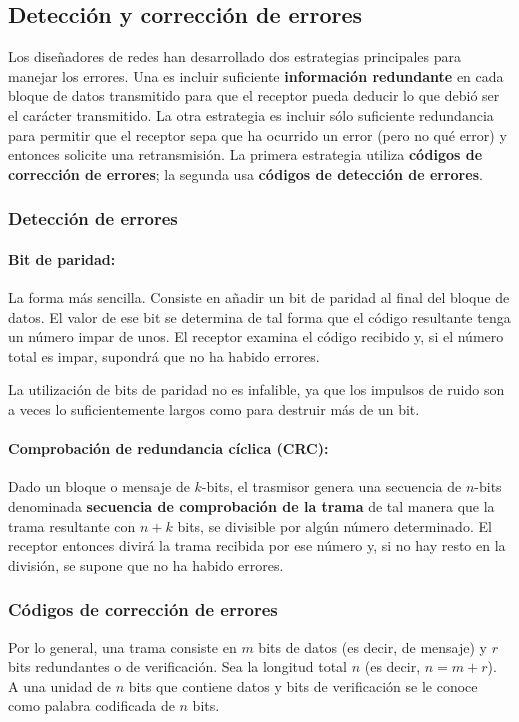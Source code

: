 \subsection{Detección y corrección de errores}

Los diseñadores de redes han desarrollado dos estrategias principales para manejar los errores. Una es incluir suficiente \textbf{información redundante} en cada bloque de datos transmitido para que el receptor pueda deducir lo que debió ser el carácter transmitido. La otra estrategia es incluir sólo suficiente redundancia para permitir que el receptor sepa que ha ocurrido un error (pero no qué error) y entonces solicite una retransmisión. La primera estrategia utiliza \textbf{códigos de corrección de errores}; la segunda usa \textbf{códigos de detección de errores}. 

\subsubsection{Detección de errores}
\paragraph{Bit de paridad:} La forma más sencilla. Consiste en añadir un bit de paridad al final del bloque de datos. El valor de ese bit se determina de tal forma que el código resultante tenga un número impar de unos. El receptor examina el código recibido y, si el número total es impar, supondrá que no ha habido errores. 

La utilización de bits de paridad no es infalible, ya que los impulsos de ruido son a veces lo suficientemente largos como para destruir más de un bit.

\paragraph{Comprobación de redundancia cíclica (CRC):} Dado un bloque o mensaje de \(k\)-bits, el trasmisor genera una secuencia de \(n\)-bits denominada \textbf{secuencia de comprobación de la trama} de tal manera que la trama resultante con \(n+k\) bits, se divisible por algún número determinado. El receptor entonces divirá la trama recibida por ese número y, si no hay resto en la división, se supone que no ha habido errores.

\subsubsection{Códigos de corrección de errores}
Por lo general, una trama consiste en \(m\) bits de datos (es decir, de mensaje) y \(r\) bits redundantes o de verificación. Sea la longitud total \(n\) (es decir, \(n = m + r\)). A una unidad de \(n\) bits que contiene datos y bits de verificación se le conoce como palabra codificada de \(n\) bits.

